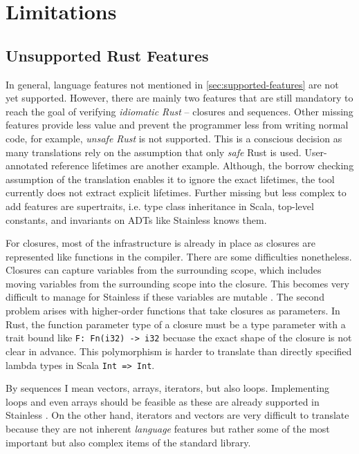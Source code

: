 \section{Limitations}
\label{impl-limitations}

\subsection{Unsupported Rust Features}

In general, language features not mentioned in \autoref{sec:supported-features}
are not yet supported. However, there are mainly two features that are still
mandatory to reach the goal of verifying \emph{idiomatic Rust} -- closures and
sequences.  Other missing features provide less value and prevent the programmer
less from writing normal code, for example, \emph{unsafe Rust} is not supported.
This is a conscious decision as many translations rely on the assumption that
only \emph{safe} Rust is used. User-annotated reference lifetimes are another
example. Although, the borrow checking assumption of the translation enables it
to ignore the exact lifetimes, the tool currently does not extract explicit
lifetimes. Further missing but less complex to add features are supertraits,
i.e. type class inheritance in Scala, top-level constants, and invariants on
ADTs like Stainless knows them.

For closures, most of the infrastructure is already in place as closures are
represented like functions in the compiler. There are some difficulties
nonetheless. Closures can capture variables from the surrounding scope, which
includes moving variables from the surrounding scope into the closure. This
becomes very difficult to manage for Stainless if these variables are mutable
\cite[section 3.4.3]{regb}. The second problem arises with higher-order
functions that take closures as parameters. In Rust, the function parameter type
of a closure must be a type parameter with a trait bound like
\passthrough{\lstinline!F: Fn(i32) -> i32!} becuase the exact shape of the
closure is not clear in advance. This polymorphism is harder to translate than
directly specified lambda types in Scala \passthrough{\lstinline!Int => Int!}.

By sequences I mean vectors, arrays, iterators, but also loops. Implementing
loops and even arrays should be feasible as these are already supported in
Stainless \cite[section "Imperative"]{stainless-doc}. On the other hand,
iterators and vectors are very difficult to translate because they are not
inherent \emph{language} features but rather some of the most important but also
complex items of the standard library.


